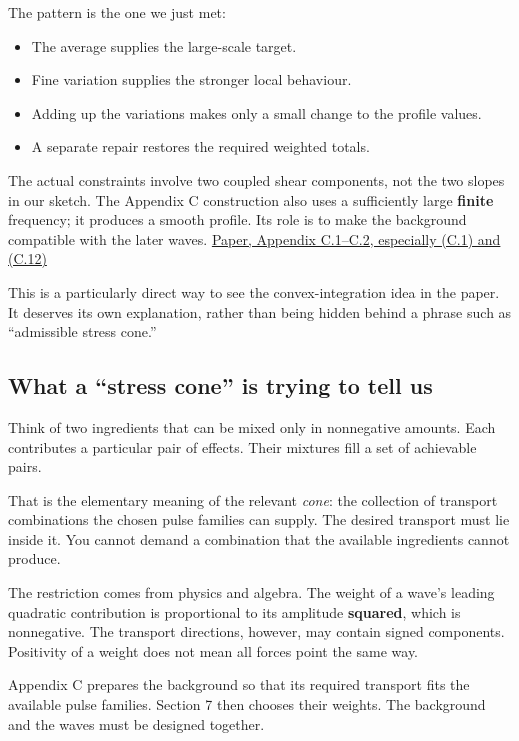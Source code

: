 \documentclass[
  english,
  11pt,
]{article}
\providecommand{\tightlist}{%
  \setlength{\itemsep}{0pt}\setlength{\parskip}{0pt}}
\begin{document}
The pattern is the one we just met:

\begin{itemize}
\tightlist
\item
  The average supplies the large-scale target.
\item
  Fine variation supplies the stronger local behaviour.
\item
  Adding up the variations makes only a small change to the profile
  values.
\item
  A separate repair restores the required weighted totals.
\end{itemize}

The actual constraints involve two coupled shear components, not the two
slopes in our sketch. The Appendix C construction also uses a
sufficiently large \textbf{finite} frequency; it produces a smooth
profile. Its role is to make the background compatible with the later
waves.
\href{https://cdn.openai.com/pdf/32d9f210-8b73-45e0-91bc-82a30aef8a9a/navier-stokes.pdf\#page=158}{Paper,
Appendix C.1--C.2, especially (C.1) and (C.12)}

This is a particularly direct way to see the convex-integration idea in
the paper. It deserves its own explanation, rather than being hidden
behind a phrase such as ``admissible stress cone.''

\subsection{What a ``stress cone'' is trying to tell
us}\label{what-a-stress-cone-is-trying-to-tell-us}

Think of two ingredients that can be mixed only in nonnegative amounts.
Each contributes a particular pair of effects. Their mixtures fill a set
of achievable pairs.

That is the elementary meaning of the relevant \emph{cone}: the
collection of transport combinations the chosen pulse families can
supply. The desired transport must lie inside it. You cannot demand a
combination that the available ingredients cannot produce.

The restriction comes from physics and algebra. The weight of a wave's
leading quadratic contribution is proportional to its amplitude
\textbf{squared}, which is nonnegative. The transport directions,
however, may contain signed components. Positivity of a weight does not
mean all forces point the same way.

Appendix C prepares the background so that its required transport fits
the available pulse families. Section 7 then chooses their weights. The
background and the waves must be designed together.
\end{document}
